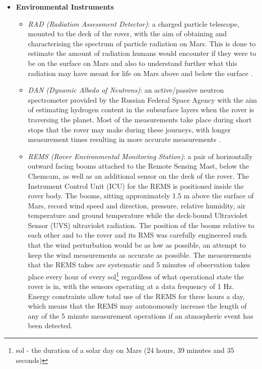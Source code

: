 \begin{itemize}
\begin{itemize}
          \end{itemize}
          \item \textbf{Environmental Instruments}
          \begin{itemize}
            \item \textit{RAD (Radiation Assessment Detector)}: a charged particle telescope, mounted to the deck of the rover, with the aim of obtaining and characterising the spectrum of particle radiation on Mars. This is done to estimate the amount of radiation humans would encounter if they were to be on the surface on Mars and also to understand further what this radiation may have meant for life on Mars above and below the surface \cite{mslsciencecornerrad}.
            \item \textit{DAN (Dynamic Albedo of Neutrons)}: an active/passive neutron spectrometer provided by the Russian Federal Space Agency with the aim of estimating hydrogen content in the subsurface layers when the rover is traversing the planet. Most of the measurements take place during short stops that the rover may make during these journeys, with longer measurement times resulting in more accurate measurements \cite{mslsciencecornerdan}.
            \item \textit{REMS (Rover Environmental Monitoring Station)}: a pair of horizontally outward facing booms attached to the Remote Sensing Mast, below the Chemcam, as well as an additional sensor on the deck of the rover. The Instrument Control Unit (ICU) for the REMS is positioned inside the rover body. The booms, sitting approximately 1.5 m above the surface of Mars, record wind speed and direction, pressure, relative humidity, air temperature and ground temperature while the deck-bound Ultraviolet Sensor (UVS) ultraviolet radiation. The position of the booms relative to each other and to the rover and its RMS was carefully engineered such that the wind perturbation would be as low as possible, an attempt to keep the wind measurements as accurate as possible. The measurements that the REMS takes are systematic and 5 minutes of observation takes place every hour of every sol\footnote{sol - the duration of a solar day on Mars (24 hours, 39 minutes and 35 seconds)} regardless of what operational state the rover is in, with the sensors operating at a data frequency of 1 Hz. Energy constraints allow total use of the REMS for three hours a day, which means that the REMS may autonomously increase the length of any of the 5 minute measurement operations if an atmospheric event has been detected.

\end{itemize}
\end{itemize}
